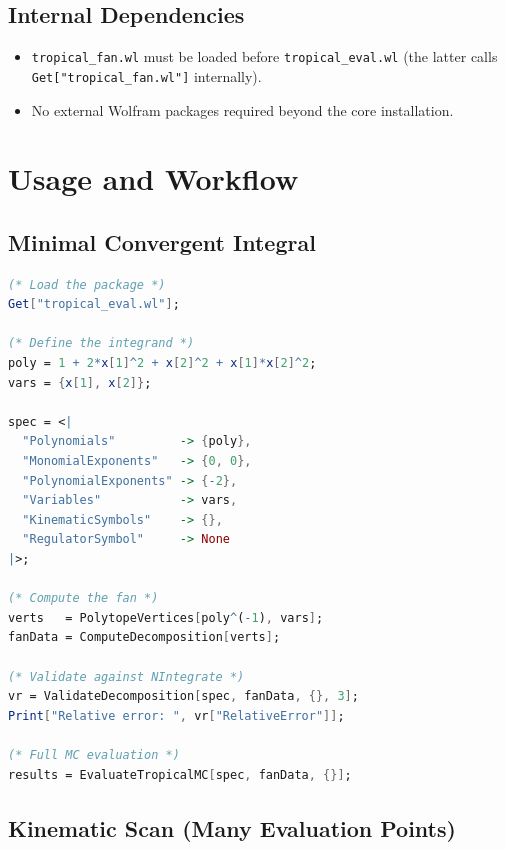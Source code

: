 \documentclass[11pt,a4paper]{article}
\begin{document}
\subsection{Internal Dependencies}

\begin{itemize}
  \item \texttt{tropical\_fan.wl} must be loaded before \texttt{tropical\_eval.wl} (the latter calls \texttt{Get["tropical\_fan.wl"]} internally).
  \item No external Wolfram packages required beyond the core installation.
\end{itemize}

\section{Usage and Workflow}

\subsection{Minimal Convergent Integral}

\begin{lstlisting}[language=Mathematica]
(* Load the package *)
Get["tropical_eval.wl"];

(* Define the integrand *)
poly = 1 + 2*x[1]^2 + x[2]^2 + x[1]*x[2]^2;
vars = {x[1], x[2]};

spec = <|
  "Polynomials"         -> {poly},
  "MonomialExponents"   -> {0, 0},
  "PolynomialExponents" -> {-2},
  "Variables"           -> vars,
  "KinematicSymbols"    -> {},
  "RegulatorSymbol"     -> None
|>;

(* Compute the fan *)
verts   = PolytopeVertices[poly^(-1), vars];
fanData = ComputeDecomposition[verts];

(* Validate against NIntegrate *)
vr = ValidateDecomposition[spec, fanData, {}, 3];
Print["Relative error: ", vr["RelativeError"]];

(* Full MC evaluation *)
results = EvaluateTropicalMC[spec, fanData, {}];
\end{lstlisting}

\subsection{Kinematic Scan (Many Evaluation Points)}
\end{document}
